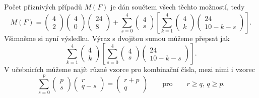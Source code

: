 \begin{example}
    Počet příznivých případů \(M(F)\) je dán součtem všech těchto možností, tedy
    \begin{equation*}
      M(F) = \begin{pmatrix}  4 \\ 2 \end{pmatrix}\begin{pmatrix} 4  \\ 0 \end{pmatrix}
             \begin{pmatrix} 24 \\ 8 \end{pmatrix} + 
              \sum^{4}_{s=0}\begin{pmatrix} 4  \\ s \end{pmatrix}
              \left[\sum^{4}_{k=1}\begin{pmatrix}  4 \\ k \end{pmatrix}
                    \begin{pmatrix} 24 \\ 10 - k - s \end{pmatrix}
              \right].
    \end{equation*}
    Všimněme si nyní výsledku. Výraz s dvojitou sumou můžeme přepsat jak
    \begin{equation*}
      \sum^{4}_{k=1}\begin{pmatrix} 4  \\ k \end{pmatrix}
        \left[\sum^{4}_{s=0}\begin{pmatrix}  4 \\ s \end{pmatrix}
              \begin{pmatrix} 24 \\ 10 - k - s \end{pmatrix}
        \right].
    \end{equation*}
    V učebnicích můžeme najít různé vzorce pro kombinační čísla, mezi nimi i vzorec
    \begin{equation*}
      \sum^{p}_{s=0}\begin{pmatrix} p \\ s \end{pmatrix}\begin{pmatrix} r \\ q - s \end{pmatrix}
        = \begin{pmatrix} r + p \\ q \end{pmatrix} \qquad\text{pro}\qquad r\geq q,\,q \geq p.

\end{equation*}
\end{example}
